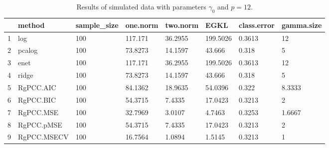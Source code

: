 \begin{table}[ht]
\centering
\begin{tabular}{rlllllll}
  \hline
 & method & sample\_size & one.norm & two.norm & EGKL & class.error & gamma.size \\ 
  \hline
1 & log & 100 & 117.171 & 36.2955 & 199.5026 & 0.3613 & 12 \\ 
  2 & pcalog & 100 & 73.8273 & 14.1597 & 43.666 & 0.318 & 5 \\ 
  3 & enet & 100 & 117.171 & 36.2955 & 199.5026 & 0.3613 & 12 \\ 
  4 & ridge & 100 & 73.8273 & 14.1597 & 43.666 & 0.318 & 5 \\ 
  5 & RgPCC.AIC & 100 & 84.1362 & 18.9635 & 54.0396 & 0.322 & 8.3333 \\ 
  6 & RgPCC.BIC & 100 & 54.3715 & 7.4335 & 17.0423 & 0.3213 & 2 \\ 
  7 & RgPCC.MSE & 100 & 32.7969 & 3.0107 & 4.7463 & 0.3253 & 1.6667 \\ 
  8 & RgPCC.pMSE & 100 & 54.3715 & 7.4335 & 17.0423 & 0.3213 & 2 \\ 
  9 & RgPCC.MSECV & 100 & 16.7564 & 1.0894 & 1.5145 & 0.3213 & 1 \\ 
   \hline
\end{tabular}
\caption{Results of simulated data with parameters $\gamma_0$ and $p =12$. } 
\label{fig-0-debug-new-algo-12-metrics-p}
\end{table}
